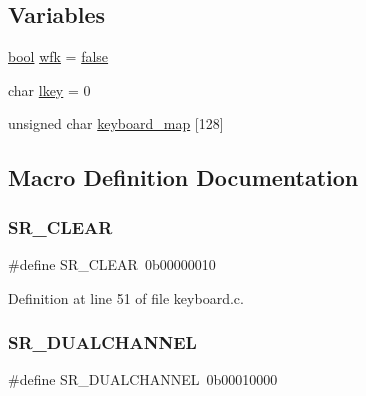 \subsection*{Variables}
\begin{DoxyCompactItemize}
\item 
\hyperlink{a00116_af6a258d8f3ee5206d682d799316314b1_af6a258d8f3ee5206d682d799316314b1}{bool} \hyperlink{a00029_a6ddd5223379778858edc46ffbec19775_a6ddd5223379778858edc46ffbec19775}{wfk} = \hyperlink{a00116_af6a258d8f3ee5206d682d799316314b1_af6a258d8f3ee5206d682d799316314b1ae9de385ef6fe9bf3360d1038396b884c}{false}
\item 
char \hyperlink{a00029_ade374650022cb30c4f5591a8dafad685_ade374650022cb30c4f5591a8dafad685}{lkey} = 0
\item 
unsigned char \hyperlink{a00029_a5d0b5e007d1b57bf84d1c03439810533_a5d0b5e007d1b57bf84d1c03439810533}{keyboard\+\_\+map} \mbox{[}128\mbox{]}
\end{DoxyCompactItemize}


\subsection{Macro Definition Documentation}
\mbox{\label{a00029_a8aa66e8bc828742fb4819d7cd2df598d_a8aa66e8bc828742fb4819d7cd2df598d}} 
\subsubsection{\texorpdfstring{S\+R\+\_\+\+C\+L\+E\+AR}{SR\_CLEAR}}
{\footnotesize\ttfamily \#define S\+R\+\_\+\+C\+L\+E\+AR~0b00000010}



Definition at line 51 of file keyboard.\+c.

\mbox{\label{a00029_addafe32b109f94a57ae4bf1a1dca05e0_addafe32b109f94a57ae4bf1a1dca05e0}} 
\subsubsection{\texorpdfstring{S\+R\+\_\+\+D\+U\+A\+L\+C\+H\+A\+N\+N\+EL}{SR\_DUALCHANNEL}}
{\footnotesize\ttfamily \#define S\+R\+\_\+\+D\+U\+A\+L\+C\+H\+A\+N\+N\+EL~0b00010000}



